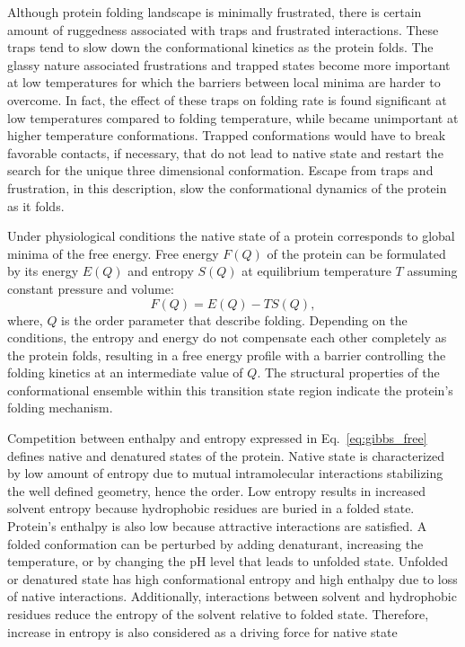 \documentclass[../talant.diss.submit.tex]{subfiles}
\begin{document}
Although protein folding landscape is minimally frustrated, there is certain amount
of ruggedness
associated with traps and frustrated interactions. These traps tend to slow down
the conformational kinetics as the protein folds. The glassy nature associated
frustrations and 
trapped states become more important at low temperatures for which the barriers
between local minima are harder to overcome.  In fact, the
effect of these traps on folding rate is found significant at low temperatures
compared to folding temperature, while became unimportant at higher temperature
conformations\cite{abkevich:94f}.  Trapped conformations would have to break
favorable contacts, if necessary, that do not lead to native state and restart
the search
for the unique three dimensional
conformation\cite{dill:97}.
Escape from traps and frustration, in this description, slow the conformational
dynamics of the protein as it folds. 

Under physiological conditions the native state of a protein corresponds to
global minima of the free energy. Free energy  $F(Q)$ of the protein can be formulated
by its energy $E(Q)$ and entropy $S(Q)$ at equilibrium temperature $T$ assuming constant
pressure and volume:
%
\begin{equation}
  \label{eq:gibbs_free}
  F(Q) = E(Q) - T S(Q),
\end{equation}
%
where, $Q$ is the order parameter that describe folding.
Depending on the conditions, the entropy and energy do not compensate each other completely
as the protein folds, resulting in a free energy profile with a barrier controlling the folding
kinetics at an intermediate value of $Q$. The structural properties of the conformational ensemble within this transition state region indicate the protein's folding mechanism. 

Competition between
enthalpy and entropy expressed in Eq.~\ref{eq:gibbs_free} defines native and denatured
states of the protein. Native state is characterized by low amount of entropy due to
mutual intramolecular interactions stabilizing the well defined geometry, hence the order.
Low entropy results in increased solvent entropy because hydrophobic residues are buried
in a folded state. Protein's enthalpy is also low because attractive interactions are satisfied.
A folded conformation can be perturbed by adding denaturant, increasing the temperature, or by
changing the pH level that leads to unfolded state. Unfolded or denatured state has high
conformational entropy and high enthalpy due to loss of native interactions. Additionally,
interactions between solvent and hydrophobic residues reduce the entropy of the solvent
relative to folded state. Therefore, increase in entropy is also considered as a driving
force for native state\cite{wolynes:15e,sali:94d,dal:18e}
\end{document}
